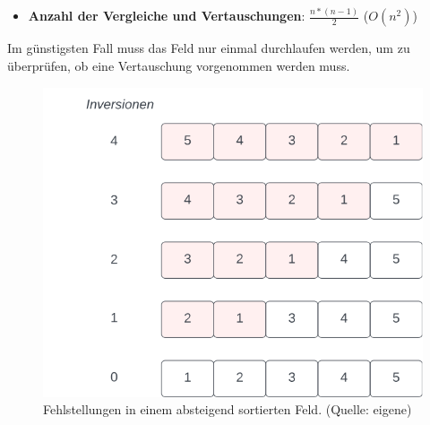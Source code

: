 \begin{itemize}
    \item \textbf{Anzahl der Vergleiche und Vertauschungen}: $\frac{n * ( n - 1)}{2}$ ($O(n^2)$)
\end{itemize}


\noindent
Im günstigsten Fall muss das Feld nur einmal durchlaufen werden, um zu überprüfen, ob eine Vertauschung vorgenommen werden muss.\\


\begin{figure}
    \begin{center}
        \includegraphics[scale=0.5]{chapters/Sortierverfahren/img/inversions}
        \caption{Fehlstellungen in einem absteigend sortierten Feld. (Quelle: eigene)}
        \label{fig:inversions}
    \end{center}
\end{figure}